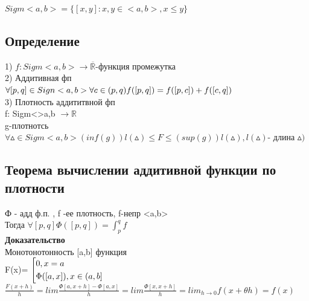\documentclass[12pt, a4paper]{article}
\begin{document}
	$Sigm<a,b> = \lbrace[x,y]:x,y \in <a,b>,x \leq y \rbrace$ \\
	
	\subsection{Определение}
	1) $f: Sigm<a,b> \rightarrow \overline{{\mathbb{R}}}$-функция промежутка \\
	2) Аддитивная фп \\
	$\forall [p,q] \in Sign<a,b> \forall c \in(p,q) \\
	f([p,q])= f([p,c])+f([c,q])$\\
	3) Плотность аддититвной фп \\
	f: Sigm<>a,b $\rightarrow \mathbb{R}$\\
	g-плотнотсь $\forall \vartriangle \in Sigm <a,b> (inf (g))l(\vartriangle)\leq F\leq(sup (g) )l(\vartriangle) ,l(\vartriangle)$- длина $\vartriangle)$\\
	
	
	\subsection{Теорема вычислении аддитивной функции по  плотности} 
	Ф - адд ф.п. , f -ее плотность, f-непр <a,b>\\
	Тогда  $\forall [p,q] \Phi([p,q])=\int_{p}^{q} f$ \\
	
	\textbf{Доказательство} \\
	Монотонотонность [a,b] функция \\
	F(x)=
	$\left[
	\begin{gathered} 
	0,x=a\hfill 
	\\
	\Phi([a,x]),x \in (a,b]\hfill 
	\\
	\end{gathered} 
	\right.$ \\
	
	$\frac{F(x+h)}{h} = lim\frac{\Phi[a,x+h]-\Phi[a,x]}{h}= lim \frac{\Phi[x,x+h]}{h}=lim_{h\rightarrow 0}f(x+\theta h )=f(x)$ \\
	
\end{document}
